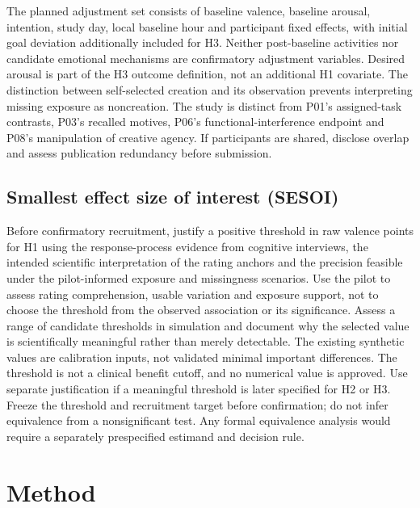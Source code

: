 \documentclass[11pt]{article}
\begin{document}
The planned adjustment set consists of baseline valence, baseline arousal, intention, study day, local baseline hour and participant fixed effects, with initial goal deviation additionally included for H3. Neither post-baseline activities nor candidate emotional mechanisms are confirmatory adjustment variables. Desired arousal is part of the H3 outcome definition, not an additional H1 covariate. The distinction between self-selected creation and its observation prevents interpreting missing exposure as noncreation. The study is distinct from P01's assigned-task contrasts, P03's recalled motives, P06's functional-interference endpoint and P08's manipulation of creative agency. If participants are shared, disclose overlap and assess publication redundancy before submission.

\subsection{Smallest effect size of interest (SESOI)}
Before confirmatory recruitment, justify a positive threshold in raw valence points for H1 using the response-process evidence from cognitive interviews, the intended scientific interpretation of the rating anchors and the precision feasible under the pilot-informed exposure and missingness scenarios. Use the pilot to assess rating comprehension, usable variation and exposure support, not to choose the threshold from the observed association or its significance. Assess a range of candidate thresholds in simulation and document why the selected value is scientifically meaningful rather than merely detectable. The existing synthetic values are calibration inputs, not validated minimal important differences. The threshold is not a clinical benefit cutoff, and no numerical value is approved. Use separate justification if a meaningful threshold is later specified for H2 or H3. Freeze the threshold and recruitment target before confirmation; do not infer equivalence from a nonsignificant test. Any formal equivalence analysis would require a separately prespecified estimand and decision rule.

\section{Method}
\end{document}
